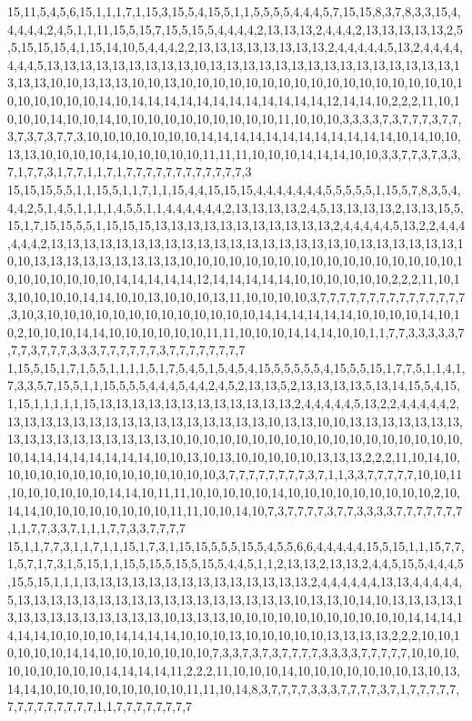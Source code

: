 15,11,5,4,5,6,15,1,1,1,7,1,15,3,15,5,4,15,5,1,1,5,5,5,5,4,4,4,5,7,15,15,8,3,7,8,3,3,15,4,4,4,4,4,2,4,5,1,1,11,15,5,15,7,15,5,15,5,4,4,4,4,2,13,13,13,2,4,4,4,2,13,13,13,13,13,2,5,5,15,15,15,4,1,15,14,10,5,4,4,4,2,2,13,13,13,13,13,13,13,13,2,4,4,4,4,4,5,13,2,4,4,4,4,4,4,4,5,13,13,13,13,13,13,13,13,13,10,13,13,13,13,13,13,13,13,13,13,13,13,13,13,13,13,13,13,10,10,13,13,13,10,10,13,10,10,10,10,10,10,10,10,10,10,10,10,10,10,10,10,10,10,10,10,10,10,10,14,10,14,14,14,14,14,14,14,14,14,14,14,14,12,14,14,10,2,2,2,11,10,10,10,10,14,10,10,14,10,10,10,10,10,10,10,10,10,10,11,10,10,10,3,3,3,3,7,3,7,7,7,3,7,7,3,7,3,7,3,7,7,3,10,10,10,10,10,10,10,14,14,14,14,14,14,14,14,14,14,14,14,10,14,10,10,13,13,10,10,10,10,14,10,10,10,10,10,11,11,11,10,10,10,14,14,14,10,10,3,3,7,7,3,7,3,3,7,1,7,7,3,1,7,7,1,1,7,1,7,7,7,7,7,7,7,7,7,7,7,7,3
15,15,15,5,5,1,1,15,5,1,1,7,1,1,15,4,4,15,15,15,4,4,4,4,4,4,4,5,5,5,5,5,1,15,5,7,8,3,5,4,4,4,2,5,1,4,5,1,1,1,1,4,5,5,1,1,4,4,4,4,4,4,2,13,13,13,13,2,4,5,13,13,13,13,2,13,13,15,5,15,1,7,15,15,5,5,1,15,15,15,13,13,13,13,13,13,13,13,13,13,13,2,4,4,4,4,4,5,13,2,2,4,4,4,4,4,4,2,13,13,13,13,13,13,13,13,13,13,13,13,13,13,13,13,13,13,10,13,13,13,13,13,13,10,10,13,13,13,13,13,13,13,13,13,10,10,10,10,10,10,10,10,10,10,10,10,10,10,10,10,10,10,10,10,10,10,10,10,14,14,14,14,14,12,14,14,14,14,14,10,10,10,10,10,10,2,2,2,11,10,13,10,10,10,10,14,14,10,10,13,10,10,10,13,11,10,10,10,10,3,7,7,7,7,7,7,7,7,7,7,7,7,7,7,7,3,10,3,10,10,10,10,10,10,10,10,10,10,10,10,10,14,14,14,14,14,14,10,10,10,10,14,10,10,2,10,10,10,14,14,10,10,10,10,10,10,11,11,10,10,10,14,14,14,10,10,1,1,7,7,3,3,3,3,3,7,7,7,3,7,7,7,3,3,3,7,7,7,7,7,7,3,7,7,7,7,7,7,7,7
1,15,5,15,1,7,1,5,5,1,1,1,1,5,1,7,5,4,5,1,5,4,5,4,15,5,5,5,5,5,4,15,5,5,15,1,7,7,5,1,1,4,1,7,3,3,5,7,15,5,1,1,15,5,5,5,4,4,4,5,4,4,2,4,5,2,13,13,5,2,13,13,13,13,5,13,14,15,5,4,15,1,15,1,1,1,1,1,15,13,13,13,13,13,13,13,13,13,13,13,13,2,4,4,4,4,4,5,13,2,2,4,4,4,4,4,2,13,13,13,13,13,13,13,13,13,13,13,13,13,13,13,13,10,13,13,10,10,13,13,13,13,13,13,13,13,13,13,13,13,13,13,13,13,13,10,10,10,10,10,10,10,10,10,10,10,10,10,10,10,10,10,10,10,14,14,14,14,14,14,14,14,10,10,13,10,13,10,10,10,10,10,13,13,13,2,2,2,11,10,14,10,10,10,10,10,10,10,10,10,10,10,10,10,10,3,7,7,7,7,7,7,7,7,3,7,1,1,3,3,7,7,7,7,7,10,10,11,10,10,10,10,10,10,14,14,10,11,11,10,10,10,10,10,14,10,10,10,10,10,10,10,10,10,2,10,14,14,10,10,10,10,10,10,10,10,11,11,10,10,14,10,7,3,7,7,7,7,3,7,7,3,3,3,3,7,7,7,7,7,7,7,1,1,7,7,3,3,7,1,1,1,7,7,3,3,7,7,7,7
15,1,1,7,7,3,1,1,7,1,1,15,1,7,3,1,15,15,5,5,5,15,5,4,5,5,6,6,4,4,4,4,4,15,5,15,1,1,15,7,7,1,5,7,1,7,3,1,5,15,1,1,15,5,15,5,15,5,15,5,4,4,5,1,1,2,13,13,2,13,13,2,4,4,5,15,5,4,4,4,5,15,5,15,1,1,1,13,13,13,13,13,13,13,13,13,13,13,13,13,13,2,4,4,4,4,4,4,13,13,4,4,4,4,4,5,13,13,13,13,13,13,13,13,13,13,13,13,13,13,13,13,13,10,13,13,10,14,10,13,13,13,13,13,13,13,13,13,13,13,13,13,13,10,13,13,13,10,10,10,10,10,10,10,10,10,10,10,14,14,14,14,14,14,10,10,10,10,14,14,14,14,10,10,10,13,10,10,10,10,10,13,13,13,13,2,2,2,10,10,10,10,10,10,14,14,10,10,10,10,10,10,10,7,3,3,7,3,7,3,7,7,7,7,3,3,3,3,7,7,7,7,7,10,10,10,10,10,10,10,10,10,14,14,14,14,11,2,2,2,11,10,10,10,14,10,10,10,10,10,10,10,13,10,13,14,14,10,10,10,10,10,10,10,10,10,11,11,10,14,8,3,7,7,7,7,3,3,3,7,7,7,7,3,7,1,7,7,7,7,7,7,7,7,7,7,7,7,7,7,1,1,7,7,7,7,7,7,7,7
